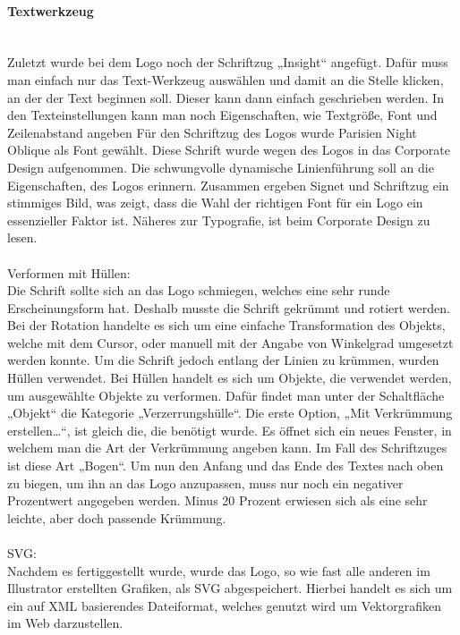\paragraph{Textwerkzeug}
\leavevmode \\
Zuletzt wurde bei dem Logo noch der Schriftzug „Insight“ angefügt. Dafür muss man einfach nur das Text-Werkzeug auswählen und damit an die Stelle klicken, an der der Text beginnen soll. Dieser kann dann einfach geschrieben werden. In den Texteinstellungen kann man noch Eigenschaften, wie Textgröße, Font und Zeilenabstand angeben\cite{fonts}
Für den Schriftzug des Logos wurde Parisien Night Oblique als Font gewählt. Diese Schrift wurde wegen des Logos in das Corporate Design aufgenommen. Die schwungvolle dynamische Linienführung soll an die Eigenschaften, des Logos erinnern. Zusammen ergeben Signet und Schriftzug ein stimmiges Bild, was zeigt, dass die Wahl der richtigen Font für ein Logo ein essenzieller Faktor ist. Näheres zur Typografie, ist beim Corporate Design zu lesen.\cite{textwerkzeug}
\leavevmode \\
\leavevmode \\
Verformen mit Hüllen:
\leavevmode \\
Die Schrift sollte sich an das Logo schmiegen, welches eine sehr runde Erscheinungsform hat. Deshalb musste die Schrift gekrümmt und rotiert werden. Bei der Rotation handelte es sich um eine einfache Transformation des Objekts, welche mit dem Cursor, oder manuell mit der Angabe von Winkelgrad umgesetzt werden konnte. Um die Schrift jedoch entlang der Linien zu krümmen, wurden Hüllen verwendet. Bei Hüllen handelt es sich um Objekte, die verwendet werden, um ausgewählte Objekte zu verformen. Dafür findet man unter der Schaltfläche „Objekt“ die Kategorie „Verzerrungshülle“. Die erste Option, „Mit Verkrümmung erstellen…“, ist gleich die, die benötigt wurde. Es öffnet sich ein neues Fenster, in welchem man die Art der Verkrümmung angeben kann. Im Fall des Schriftzuges ist diese Art „Bogen“. Um nun den Anfang und das Ende des Textes nach oben zu biegen, um ihn an das Logo anzupassen, muss nur noch ein negativer Prozentwert angegeben werden. Minus 20 Prozent erwiesen sich als eine sehr leichte, aber doch passende Krümmung.\cite{huellen}
\leavevmode \\
\leavevmode \\
SVG:
\leavevmode \\
Nachdem es fertiggestellt wurde, wurde das Logo, so wie fast alle anderen im Illustrator erstellten Grafiken, als SVG abgespeichert. Hierbei handelt es sich um ein auf XML basierendes Dateiformat, welches genutzt wird um Vektorgrafiken im Web darzustellen.\cite{svg}

